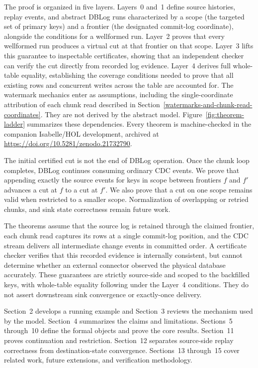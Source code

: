 \documentclass[letterpaper,10pt,twocolumn]{article}
\begin{document}
The proof is organized in five layers. Layers~0 and~1 define source 
histories, replay events, and abstract DBLog runs characterized 
by a scope (the targeted set of primary keys) and a frontier 
(the designated commit-log coordinate), alongside the conditions for a 
wellformed run. Layer~2 proves that every wellformed run produces a 
virtual cut at that frontier on that scope. Layer~3 lifts this 
guarantee to inspectable certificates, showing that an independent 
checker can verify the cut directly from recorded log evidence. 
Layer~4 derives full whole-table equality, establishing the 
coverage conditions needed to prove that all existing rows and 
concurrent writes across the table are accounted for. The watermark 
mechanics enter as assumptions, including the single-coordinate 
attribution of each chunk read described in Section~\ref{watermarks-and-chunk-read-coordinates}. 
They are not derived by the abstract model. Figure~\ref{fig:theorem-ladder} 
summarizes these dependencies. Every theorem is machine-checked in the 
companion Isabelle/HOL development, archived at
\url{https://doi.org/10.5281/zenodo.21732790}.

\begin{figure}[t]
  
\end{figure}

The initial certified cut is not the end of DBLog operation. Once the
chunk loop completes, DBLog continues consuming ordinary CDC events. We
prove that appending exactly the source events for keys in scope between
frontiers $f$ and $f'$ advances a cut at $f$ to a cut at $f'$. We also
prove that a cut on one scope remains valid when restricted to a smaller
scope. Normalization of overlapping or retried chunks, and sink state 
correctness remain future work.

The theorems assume that the source log is retained through the claimed frontier, 
each chunk read captures its rows at a single commit-log position, and the CDC 
stream delivers all intermediate change events in committed order. A certificate 
checker verifies that this recorded evidence is internally consistent, but cannot 
determine whether an external connector observed the physical database accurately. 
These guarantees are strictly source-side and scoped to the backfilled keys,
with whole-table equality following under the Layer~4 conditions. 
They do not assert downstream sink convergence or exactly-once delivery.

Section~2 develops a running example and Section~3 reviews the mechanism
used by the model. Section~4 summarizes the claims and limitations.
Sections~5 through~10 define the formal objects and prove the core
results. Section~11 proves continuation and restriction. Section~12
separates source-side replay correctness from destination-state
convergence. Sections~13 through~15 cover related work, future
extensions, and verification methodology.
\end{document}
